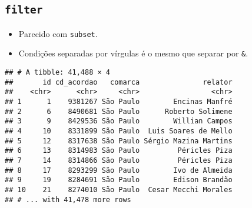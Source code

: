 \documentclass[]{book}
\newenvironment{Shaded}{\begin{snugshade}}{\end{snugshade}}
\newcommand{\KeywordTok}[1]{\textcolor[rgb]{0.13,0.29,0.53}{\textbf{{#1}}}}
\newcommand{\DataTypeTok}[1]{\textcolor[rgb]{0.13,0.29,0.53}{{#1}}}
\newcommand{\DecValTok}[1]{\textcolor[rgb]{0.00,0.00,0.81}{{#1}}}
\newcommand{\StringTok}[1]{\textcolor[rgb]{0.31,0.60,0.02}{{#1}}}
\newcommand{\NormalTok}[1]{{#1}}
\providecommand{\tightlist}{%
  \setlength{\itemsep}{0pt}\setlength{\parskip}{0pt}}
\begin{document}
\subsection{\texorpdfstring{\texttt{filter}}{filter}}\label{filter}

\begin{itemize}
\tightlist
\item
  Parecido com \texttt{subset}.
\item
  Condições separadas por vírgulas é o mesmo que separar por
  \texttt{\&}.
\end{itemize}

\begin{Shaded}
\end{Shaded}

\begin{verbatim}
## # A tibble: 41,488 × 4
##       id cd_acordao   comarca               relator
##    <chr>      <chr>     <chr>                 <chr>
## 1      1    9381267 São Paulo        Encinas Manfré
## 2      6    8490681 São Paulo      Roberto Solimene
## 3      9    8429536 São Paulo        Willian Campos
## 4     10    8331899 São Paulo  Luis Soares de Mello
## 5     12    8317638 São Paulo Sérgio Mazina Martins
## 6     13    8314983 São Paulo         Péricles Piza
## 7     14    8314866 São Paulo         Péricles Piza
## 8     17    8293299 São Paulo        Ivo de Almeida
## 9     19    8284691 São Paulo        Edison Brandão
## 10    21    8274010 São Paulo  Cesar Mecchi Morales
## # ... with 41,478 more rows
\end{verbatim}

\begin{Shaded}
\end{Shaded}
\end{document}
